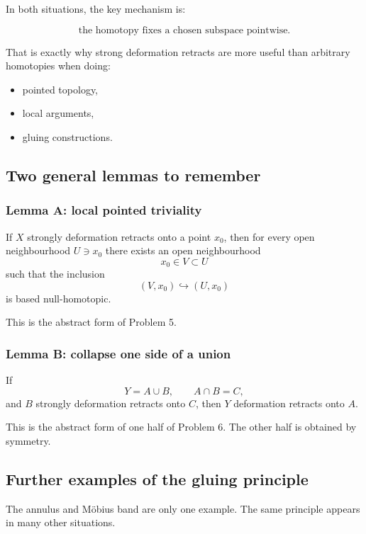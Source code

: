 \documentclass[12pt,a4paper]{article}
\theoremstyle{notespace}
\begin{document}
In both situations, the key mechanism is:

\[
\text{the homotopy fixes a chosen subspace pointwise.}
\]

That is exactly why strong deformation retracts are more useful than arbitrary homotopies when doing:

\begin{itemize}
	\item pointed topology,
	\item local arguments,
	\item gluing constructions.
\end{itemize}

\subsection{Two general lemmas to remember}

\subsubsection{Lemma A: local pointed triviality}

If \(X\) strongly deformation retracts onto a point \(x_0\), then for every open neighbourhood \(U\ni x_0\) there exists an open neighbourhood
\[
x_0\in V\subset U
\]
such that the inclusion
\[
(V,x_0)\hookrightarrow (U,x_0)
\]
is based null-homotopic.

\medskip

This is the abstract form of Problem 5.

\subsubsection{Lemma B: collapse one side of a union}

If
\[
Y=A\cup B,
\qquad
A\cap B=C,
\]
and \(B\) strongly deformation retracts onto \(C\), then \(Y\) deformation retracts onto \(A\).

\medskip

This is the abstract form of one half of Problem 6. The other half is obtained by symmetry.

\subsection{Further examples of the gluing principle}

The annulus and Möbius band are only one example. The same principle appears in many other situations.
\end{document}
